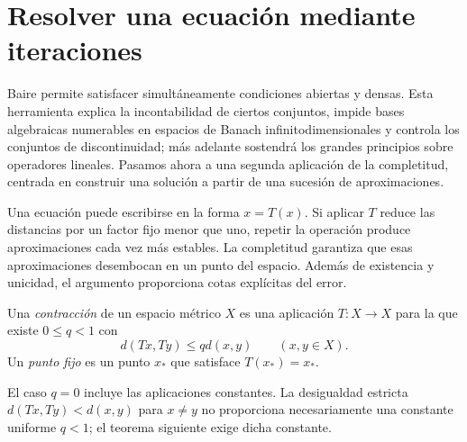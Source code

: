 \section{Resolver una ecuación mediante iteraciones}
\label{lectura:11}
Baire permite satisfacer simultáneamente condiciones abiertas y densas. Esta herramienta explica la incontabilidad de ciertos conjuntos, impide bases algebraicas numerables en espacios de Banach infinitodimensionales y controla los conjuntos de discontinuidad; más adelante sostendrá los grandes principios sobre operadores lineales. Pasamos ahora a una segunda aplicación de la completitud, centrada en construir una solución a partir de una sucesión de aproximaciones.

Una ecuación puede escribirse en la forma $x=T(x)$. Si aplicar $T$ reduce las distancias por un factor fijo menor que uno, repetir la operación produce aproximaciones cada vez más estables. La completitud garantiza que esas aproximaciones desembocan en un punto del espacio. Además de existencia y unicidad, el argumento proporciona cotas explícitas del error.

\begin{definicion}
Una \emph{contracción} de un espacio métrico $X$ es una aplicación $T:X\to X$ para la que existe $0\leq q<1$ con
\[
 d(Tx,Ty)\leq qd(x,y)\qquad(x,y\in X).
\]
Un \emph{punto fijo} es un punto $x_*$ que satisface $T(x_*)=x_*$.
\end{definicion}
El caso $q=0$ incluye las aplicaciones constantes. La desigualdad estricta $d(Tx,Ty)<d(x,y)$ para $x\ne y$ no proporciona necesariamente una constante uniforme $q<1$; el teorema siguiente exige dicha constante.

